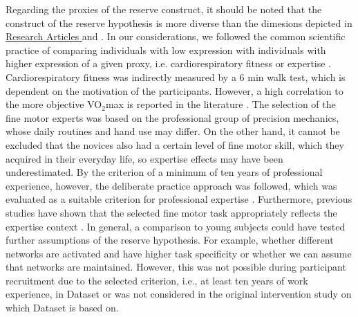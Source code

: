 Regarding the proxies of the reserve construct, it should be noted that the construct of the reserve hypothesis is more diverse than the dimesions depicted in \hyperref[results:paperI]{Research Articles } and \hyperref[results:paperI]{}. In our considerations, we followed the common scientific practice of comparing individuals with low expression with individuals with higher expression of a given proxy, i.e. cardiorespiratory fitness or expertise \cite{Koen2019}. Cardiorespiratory fitness was indirectly measured by a 6 min walk test, which is dependent on the motivation of the participants. However, a high correlation to the more objective VO$_2$max is reported in the literature \cite{Zhang2017}. The selection of the fine motor experts was based on the professional group of precision mechanics, whose daily routines and hand use may differ. On the other hand, it cannot be excluded that the novices also had a certain level of fine motor skill, which they acquired in their everyday life, so expertise effects may have been underestimated. By the criterion of a minimum of ten years of professional experience, however, the deliberate practice approach was followed, which was evaluated as a suitable criterion for professional expertise \cite{Ericsson1991, Voelcker-Rehage2013}. Furthermore, previous studies have shown that the selected fine motor task appropriately reflects the expertise context \cite{Vieluf2018, Goelz2018, Vieluf2012, Vieluf2013}. In general, a comparison to young subjects could have tested further assumptions of the reserve hypothesis. For example, whether different networks are activated and have higher task specificity or whether we can assume that networks are maintained. However, this was not possible during participant recruitment due to the selected criterion, i.e., at least ten years of work experience, in Dataset  or was not considered in the original intervention study on which Dataset  is based on.\\
